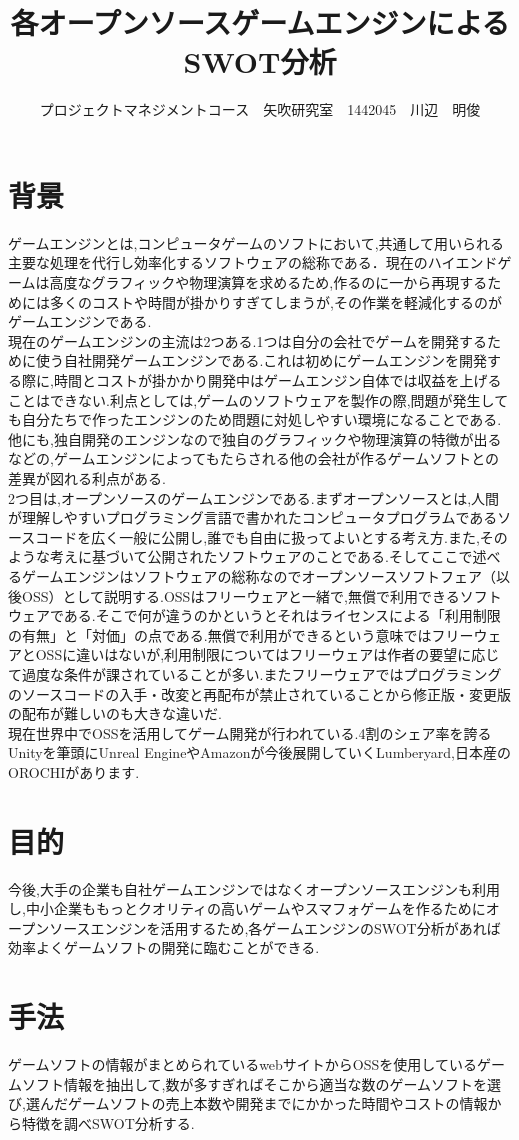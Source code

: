 \documentclass[uplatex,twocolumn,dvipdfmx]{jsarticle}
\title{\vspace{-5mm}\fontsize{14pt}{0pt}\selectfont 各オープンソースゲームエンジンによるSWOT分析}
\author{\normalsize プロジェクトマネジメントコース　矢吹研究室　1442045　川辺　明俊}
\date{}
\begin{document}
\fontsize{10.5pt}{\baselineskip}\selectfont
\maketitle





\section{背景}
ゲームエンジンとは,コンピュータゲームのソフトにおいて,共通して用いられる主要な処理を代行し効率化するソフトウェアの総称である．現在のハイエンドゲームは高度なグラフィックや物理演算を求めるため,作るのに一から再現するためには多くのコストや時間が掛かりすぎてしまうが,その作業を軽減化するのがゲームエンジンである.\\
現在のゲームエンジンの主流は2つある.1つは自分の会社でゲームを開発するために使う自社開発ゲームエンジンである.これは初めにゲームエンジンを開発する際に,時間とコストが掛かかり開発中はゲームエンジン自体では収益を上げることはできない.利点としては,ゲームのソフトウェアを製作の際,問題が発生しても自分たちで作ったエンジンのため問題に対処しやすい環境になることである.他にも,独自開発のエンジンなので独自のグラフィックや物理演算の特徴が出るなどの,ゲームエンジンによってもたらされる他の会社が作るゲームソフトとの差異が図れる利点がある.\\
2つ目は,オープンソースのゲームエンジンである.まずオープンソースとは,人間が理解しやすいプログラミング言語で書かれたコンピュータプログラムであるソースコードを広く一般に公開し,誰でも自由に扱ってよいとする考え方.また,そのような考えに基づいて公開されたソフトウェアのことである.そしてここで述べるゲームエンジンはソフトウェアの総称なのでオープンソースソフトフェア（以後OSS）として説明する.OSSはフリーウェアと一緒で,無償で利用できるソフトウェアである.そこで何が違うのかというとそれはライセンスによる「利用制限の有無」と「対価」の点である.無償で利用ができるという意味ではフリーウェアとOSSに違いはないが,利用制限についてはフリーウェアは作者の要望に応じて過度な条件が課されていることが多い.またフリーウェアではプログラミングのソースコードの入手・改変と再配布が禁止されていることから修正版・変更版の配布が難しいのも大きな違いだ\cite{matsumoto}.\\
現在世界中でOSSを活用してゲーム開発が行われている.4割のシェア率を誇るUnityを筆頭にUnreal EngineやAmazonが今後展開していくLumberyard,日本産のOROCHIがあります.\\
\section{目的}
今後,大手の企業も自社ゲームエンジンではなくオープンソースエンジンも利用し,中小企業ももっとクオリティの高いゲームやスマフォゲームを作るためにオープンソースエンジンを活用するため,各ゲームエンジンのSWOT分析があれば効率よくゲームソフトの開発に臨むことができる.
\section{手法}
ゲームソフトの情報がまとめられているwebサイトからOSSを使用しているゲームソフト情報を抽出して,数が多すぎればそこから適当な数のゲームソフトを選び,選んだゲームソフトの売上本数や開発までにかかった時間やコストの情報から特徴を調べSWOT分析する.








\end{document}
